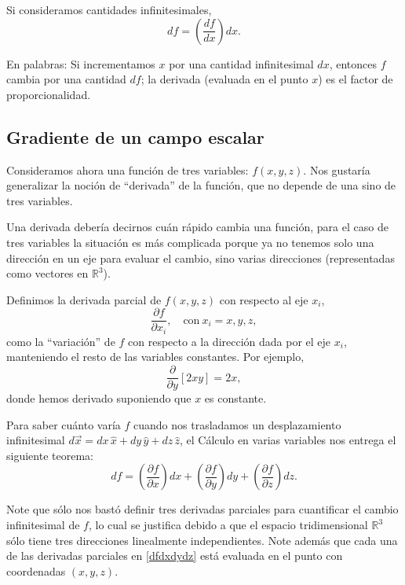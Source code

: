Si consideramos cantidades infinitesimales,
\begin{equation}
df = \left(\frac{df}{dx} \right) dx.
\end{equation}


En palabras: Si incrementamos $x$ por una cantidad infinitesimal $dx$, entonces $f$ cambia por una cantidad $df$; la derivada (evaluada en el punto $x$) es el factor de proporcionalidad.

\subsection{Gradiente de un campo escalar}

Consideramos ahora una función de tres variables: $f(x,y,z)$. Nos gustaría generalizar la noción de “derivada” de la función, que no depende de una sino de tres variables.

Una derivada debería decirnos cuán rápido cambia una función, para el caso de tres variables la situación es más complicada porque ya no tenemos solo una dirección en un eje para evaluar el cambio, sino varias direcciones (representadas como vectores en $\mathbb{R}^3$). 

Definimos la derivada parcial de $f(x,y,z)$ con respecto al eje $x_i$,
\begin{equation}
\frac{\partial f}{\partial x_i}, \quad \text{con} ~ x_i = x,y,z,
\end{equation}
como la ``variación” de $f$ con respecto a la dirección dada por el eje $x_i$, manteniendo el resto de las variables constantes. Por ejemplo, 
\begin{equation}
\frac{\partial}{\partial y}[2xy] = 2x,
\end{equation}
donde hemos derivado suponiendo que $x$ es constante.

Para saber cuánto varía $f$ cuando nos trasladamos un desplazamiento infinitesimal $d\Vec{x} = dx \, \hat{x} + dy \,\hat{y} + dz \,\hat{z}$, el Cálculo en varias variables nos entrega el siguiente teorema:
\begin{equation}\label{dfdxdydz}
df = \left(\frac{\partial f}{\partial x}\right) dx + \left(\frac{\partial f}{\partial y}\right) dy +\left(\frac{\partial f}{\partial z}\right) dz.
\end{equation}

Note que sólo nos bastó definir tres derivadas parciales para cuantificar el cambio infinitesimal de $f$, lo cual se justifica debido a que el espacio tridimensional $\mathbb{R}^3$ sólo tiene tres direcciones linealmente independientes. Note además que cada una de las derivadas parciales en \eqref{dfdxdydz} está evaluada en el punto con coordenadas $(x,y,z)$.

